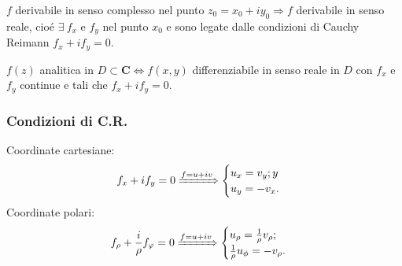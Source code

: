 \begin{theorem}
    $f$ derivabile in senso complesso nel punto $z_0=x_0+iy_0 \Rightarrow f$ derivabile in senso reale, cioé $\exists\ f_x$ e $f_y$ nel punto $x_0$ e sono legate dalle condizioni di Cauchy Reimann $f_x+if_y=0$. 
\end{theorem}

\begin{theorem}
    $f(z)$ analitica in $D \subset \mathbf{C} \Leftrightarrow f(x,y)$ differenziabile in senso reale in $D$ con $f_x$ e $f_y$ continue e tali che $f_x+if_y=0$.
\end{theorem}
\subsubsection*{Condizioni di C.R.}
Coordinate cartesiane:
\[
   f_x +if_y=0\xRightarrow[]{f=u+iv}
  \begin{cases}
    u_x = v_y;y
    \\
    u_y = -v_x. 
  \end{cases}
\]
Coordinate polari:
\[
    f_{\rho} + \frac{i}{\rho} f_{\varphi}=0\xRightarrow[]{f=u+iv} 
    \begin{cases}
      u_{\rho}=\frac{1}{\rho}v_{\rho}; \\
      \frac{1}{\rho}u_\phi =-v_\rho.
    \end{cases}
\]

